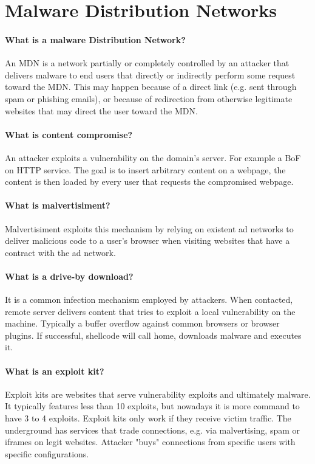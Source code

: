 \section{Malware Distribution Networks}
\paragraph{What is a malware Distribution Network?}
An MDN is a network partially or completely controlled by an attacker that delivers malware to end users that directly or indirectly perform some request toward the MDN. This may happen because of a direct link (e.g. sent through spam or phishing emails), or because of redirection from otherwise legitimate websites that may direct the user toward the MDN.

\paragraph{What is content compromise?}
An attacker exploits a vulnerability on the domain's server. For example a BoF on HTTP service. The goal is to insert arbitrary content on a webpage, the content is then loaded by every user that requests the compromised webpage.

\paragraph{What is malvertisiment?}
Malvertisiment exploits this mechanism by relying on existent ad networks to deliver malicious code to a user's browser when visiting websites that have a contract with the ad network.

\paragraph{What is a drive-by download?}
It is a common infection mechanism employed by attackers. When contacted, remote server delivers content that tries to exploit a local vulnerability on the machine. Typically a buffer overflow against common browsers or browser plugins. If successful, shellcode will call home, downloads malware and executes it.

\paragraph{What is an exploit kit?}
Exploit kits are websites that serve vulnerability exploits and ultimately malware. It typically features less than 10 exploits, but nowadays it is more command to have 3 to 4 exploits. Exploit kits only work if they receive victim traffic. The underground has services that trade connections, e.g. via malvertising, spam or iframes on legit websites. Attacker "buys" connections from specific users with specific configurations.

